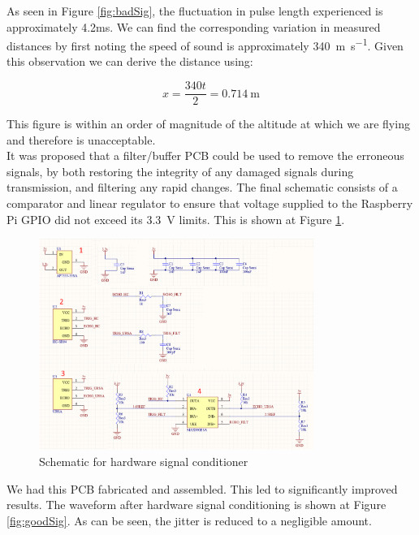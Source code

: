 \documentclass[capstone_report.tex]{subfiles}
\begin{document}
As seen in Figure \ref{fig:badSig}, the fluctuation in pulse length experienced is approximately 4.2ms.  We can find the corresponding variation in measured distances by first noting the speed of sound is approximately \SI{340}{\metre\per\second}.  Given this observation we can derive the distance using:

\[
    x=\frac{340t}{2} = \SI{0.714}{\metre}
\]

This figure is within an order of magnitude of the altitude at which we are flying and therefore is unacceptable.\\

It was proposed that a filter/buffer PCB could be used to remove the erroneous signals, by both restoring the integrity of any damaged signals during transmission, and filtering any rapid changes. The final schematic consists of a comparator and linear regulator to ensure that voltage supplied to the Raspberry Pi GPIO did not exceed its \SI{3.3}{\volt} limits. This is shown at Figure \ref{fig:sigSchem}.

    \begin{figure}[H]
        \centering
        \includegraphics[width=0.8\textwidth]{imgs/schematic.png}
        \caption{Schematic for hardware signal conditioner\label{fig:sigSchem}}
    \end{figure}

We had this PCB fabricated and assembled. This led to significantly improved results. The waveform after hardware signal conditioning is shown at Figure \ref{fig:goodSig}. As can be seen, the jitter is reduced to a negligible amount.
\end{document}
